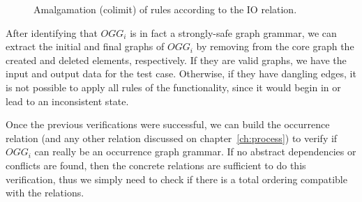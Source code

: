 \begin{figure}[!ht]
  \centering
  \caption{Amalgamation (colimit) of rules according to the IO relation.}\label{fig:tests:colimit}
\end{figure}

\begin{example}\label{ex:amalgamation}
\end{example}

After identifying that $OGG_i$ is in fact a strongly-safe graph grammar, we can extract the initial and final graphs of $OGG_i$ by removing from the core graph the created and deleted elements, respectively. If they are valid graphs, we have the input and output data for the test case. Otherwise, if they have dangling edges, it is not possible to apply all rules of the functionality, since it would begin in or lead to an inconsistent state.

\begin{example}
\end{example}

Once the previous verifications were successful, we can build the occurrence relation (and any other relation discussed on chapter~\ref{ch:process}) to verify if $OGG_i$ can really be an occurrence graph grammar. If no abstract dependencies or conflicts are found, then the concrete relations are sufficient to do this verification, thus we simply need to check if there is a total ordering compatible with the relations.

\begin{example}
\end{example}

